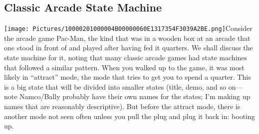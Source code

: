 \subsection[Classic Arcade State
Machine]{\texorpdfstring{\protect\hypertarget{anchor-8}{}{}Classic
Arcade State
Machine}{Classic Arcade State Machine}}\label{classic-arcade-state-machine}

\texttt{[image: Pictures/10000201000004B00000060E1317354F3039A2BE.png]}Consider
the arcade game Pac-Man, the kind that was in a wooden box at an arcade
that one stood in front of and played after having fed it quarters. We
shall discuss the state machine for it, noting that many classic arcade
games had state machines that followed a similar pattern. When you
walked up to the game, it was most likely in ``attract'' mode, the mode
that tries to get you to spend a quarter. This is a big state that will
be divided into smaller states (title, demo, and so on---note
Namco/Bally probably have their own names for the states; I'm making up
names that are reasonably descriptive). But before the attract mode,
there is another mode not seen often unless you pull the plug and plug
it back in: booting up.


